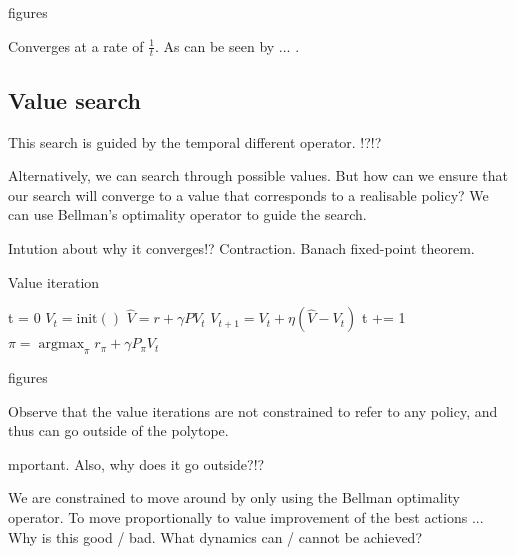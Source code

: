 {\color{red}figures}


Converges at a rate of $\frac{1}{t}$. As can be seen by ...
\cite{Agarwal2019a}.

\subsection{Value search}

This search is guided by the temporal different operator. !?!?

Alternatively, we can search through possible values. But how can we ensure that our search will
converge to a value that corresponds to a realisable policy? We can use Bellman's
optimality operator to guide the search.

Intution about why it converges!? Contraction. Banach fixed-point theorem.


\begin{algorithm}
\caption{Value iteration}
\begin{algorithmic}[1]

  \State t = 0
  \State $V_t = \text{init}()$
    \State $\hat V = r + \gamma PV_t$ 
    \State $V_{t+1} = V_t + \eta (\hat V - V_t)$ 
    \State t += 1
  \EndWhile
  \State $\pi = \mathop{\text{argmax}}_{\pi} r_{\pi} + \gamma P_{\pi}V_t$
  \State \algorithmicreturn{ $\pi$}
\EndProcedure

\end{algorithmic}
\end{algorithm}

{\color{red}figures}


Observe that the value iterations are not constrained to refer to any policy,
and thus can go outside of the polytope. \cite{Dadashi2018}

{\color{red}mportant. Also, why does it go outside?!?}

We are constrained to move around by only using the Bellman optimality operator.
To move proportionally to value improvement of the best actions ...
Why is this good / bad. What dynamics can / cannot be achieved?

